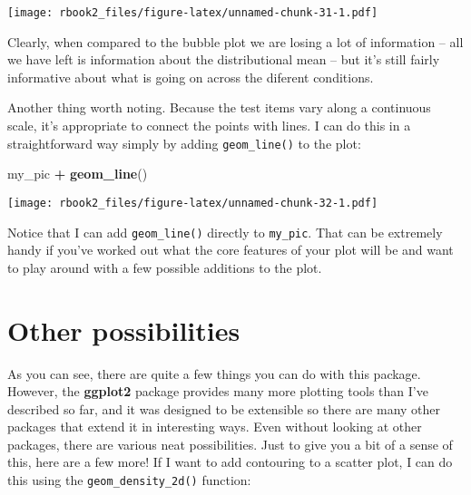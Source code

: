 \documentclass[]{book}
\newenvironment{Shaded}{\begin{snugshade}}{\end{snugshade}}
\newcommand{\DataTypeTok}[1]{\textcolor[rgb]{0.13,0.29,0.53}{#1}}
\newcommand{\DecValTok}[1]{\textcolor[rgb]{0.00,0.00,0.81}{#1}}
\newcommand{\KeywordTok}[1]{\textcolor[rgb]{0.13,0.29,0.53}{\textbf{#1}}}
\newcommand{\NormalTok}[1]{#1}
\newcommand{\OperatorTok}[1]{\textcolor[rgb]{0.81,0.36,0.00}{\textbf{#1}}}
\newcommand{\StringTok}[1]{\textcolor[rgb]{0.31,0.60,0.02}{#1}}
\begin{document}
\texttt{[image: rbook2\_files/figure-latex/unnamed-chunk-31-1.pdf]}

Clearly, when compared to the bubble plot we are losing a lot of information -- all we have left is information about the distributional mean -- but it's still fairly informative about what is going on across the diferent conditions.

Another thing worth noting. Because the test items vary along a continuous scale, it's appropriate to connect the points with lines. I can do this in a straightforward way simply by adding \texttt{geom\_line()} to the plot:

\begin{Shaded}
\begin{Highlighting}[]
\NormalTok{my_pic }\OperatorTok{+}\StringTok{ }\KeywordTok{geom_line}\NormalTok{()}
\end{Highlighting}
\end{Shaded}

\texttt{[image: rbook2\_files/figure-latex/unnamed-chunk-32-1.pdf]}

Notice that I can add \texttt{geom\_line()} directly to \texttt{my\_pic}. That can be extremely handy if you've worked out what the core features of your plot will be and want to play around with a few possible additions to the plot.

\hypertarget{other-possibilities}{%
\section{Other possibilities}\label{other-possibilities}}

As you can see, there are quite a few things you can do with this package. However, the \textbf{ggplot2} package provides many more plotting tools than I've described so far, and it was designed to be extensible so there are many other packages that extend it in interesting ways. Even without looking at other packages, there are various neat possibilities. Just to give you a bit of a sense of this, here are a few more! If I want to add contouring to a scatter plot, I can do this using the \texttt{geom\_density\_2d()} function:

\begin{Shaded}
\end{Shaded}
\end{document}
